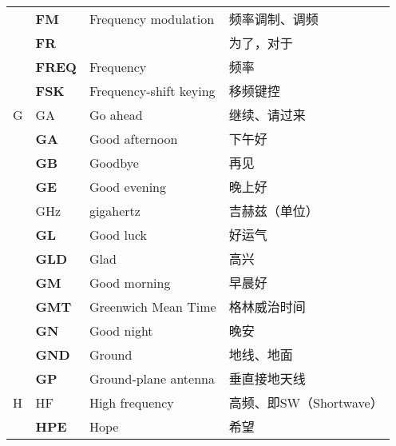 \begin{longtable}[l]{llll}
    & \textbf{FM}                       & Frequency modulation                    & 频率调制、调频             \\
    & \textbf{FR}                       &                                         & 为了，对于               \\
    & \textbf{FREQ}                     & Frequency                               & 频率                  \\
    & \textbf{FSK}                      & Frequency-shift keying                  & 移频键控                \\
  G & GA                                & Go ahead                                & 继续、请过来              \\
    & \textbf{GA}                       & Good afternoon                          & 下午好                 \\
    & \textbf{GB}                       & Goodbye                                 & 再见                  \\
    & \textbf{GE}                       & Good evening                            & 晚上好                 \\
    & \si{\GHz}                         & gigahertz                               & 吉赫兹（单位）             \\
    & \textbf{GL}                       & Good luck                               & 好运气                 \\
    & \textbf{GLD}                      & Glad                                    & 高兴                  \\
    & \textbf{GM}                       & Good morning                            & 早晨好                 \\
    & \textbf{GMT}                      & Greenwich Mean Time                     & 格林威治时间              \\ %
    & \textbf{GN}                       & Good night                              & 晚安                  \\
    & \textbf{GND}                      & Ground                                  & 地线、地面               \\
    & \textbf{GP}                       & Ground-plane antenna                    & 垂直接地天线              \\
  H & HF                                & High frequency                          & 高频、即SW（Shortwave）   \\
    & \textbf{HPE}                      & Hope                                    & 希望                  \\

\end{longtable}
